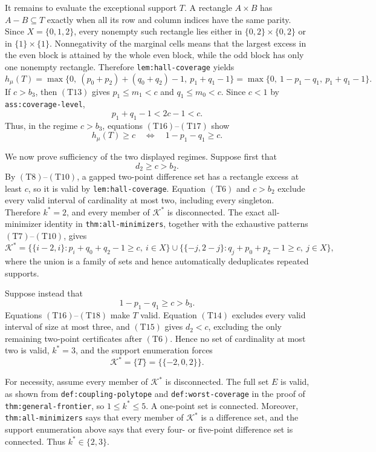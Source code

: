 It remains to evaluate the exceptional support \(T\).  A rectangle \(A\times B\) has \(A-B\subseteq T\) exactly when all its row and column indices have the same parity.  Since \(X=\{0,1,2\}\), every nonempty such rectangle lies either in \(\{0,2\}\times\{0,2\}\) or in \(\{1\}\times\{1\}\).  Nonnegativity of the marginal cells means that the largest excess in the even block is attained by the whole even block, while the odd block has only one nonempty rectangle.  Therefore \texttt{lem:hall-coverage} yields
\[
h_\mu(T)
=\max\{0,\ (p_0+p_2)+(q_0+q_2)-1,\ p_1+q_1-1\}
=\max\{0,\ 1-p_1-q_1,\ p_1+q_1-1\}.
\tag{T16}
\]
If \(c>b_3\), then \((\mathrm{T13})\) gives \(p_1\leq m_1<c\) and \(q_1\leq m_0<c\).  Since \(c<1\) by \texttt{ass:coverage-level},
\[
p_1+q_1-1<2c-1<c.
\tag{T17}
\]
Thus, in the regime \(c>b_3\), equations \((\mathrm{T16})\)--\((\mathrm{T17})\) show
\[
h_\mu(T)\geq c
\quad\Longleftrightarrow\quad 1-p_1-q_1\geq c.
\tag{T18}
\]

We now prove sufficiency of the two displayed regimes.  Suppose first that
\[
d_2\geq c>b_2.
\tag{T19}
\]
By \((\mathrm{T8})\)--\((\mathrm{T10})\), a gapped two-point difference set has a rectangle excess at least \(c\), so it is valid by \texttt{lem:hall-coverage}.  Equation \((\mathrm{T6})\) and \(c>b_2\) exclude every valid interval of cardinality at most two, including every singleton.  Therefore \(k^*=2\), and every member of \(\mathcal K^*\) is disconnected.  The exact all-minimizer identity in \texttt{thm:all-minimizers}, together with the exhaustive patterns \((\mathrm{T7})\)--\((\mathrm{T10})\), gives
\[
\mathcal K^*
=\bigl\{\{i-2,i\}:p_i+q_0+q_2-1\geq c,\ i\in X\bigr\}
\mathbin{\cup}
\bigl\{\{-j,2-j\}:q_j+p_0+p_2-1\geq c,\ j\in X\bigr\},
\tag{T20}
\]
where the union is a family of sets and hence automatically deduplicates repeated supports.

Suppose instead that
\[
1-p_1-q_1\geq c>b_3.
\tag{T21}
\]
Equations \((\mathrm{T16})\)--\((\mathrm{T18})\) make \(T\) valid.  Equation \((\mathrm{T14})\) excludes every valid interval of size at most three, and \((\mathrm{T15})\) gives \(d_2<c\), excluding the only remaining two-point certificates after \((\mathrm{T6})\).  Hence no set of cardinality at most two is valid, \(k^*=3\), and the support enumeration forces
\[
\mathcal K^*=\{T\}=\bigl\{\{-2,0,2\}\bigr\}.
\tag{T22}
\]

For necessity, assume every member of \(\mathcal K^*\) is disconnected.  The full set \(E\) is valid, as shown from \texttt{def:coupling-polytope} and \texttt{def:worst-coverage} in the proof of \texttt{thm:general-frontier}, so \(1\leq k^*\leq5\).  A one-point set is connected.  Moreover, \texttt{thm:all-minimizers} says that every member of \(\mathcal K^*\) is a difference set, and the support enumeration above says that every four- or five-point difference set is connected.  Thus \(k^*\in\{2,3\}\).

